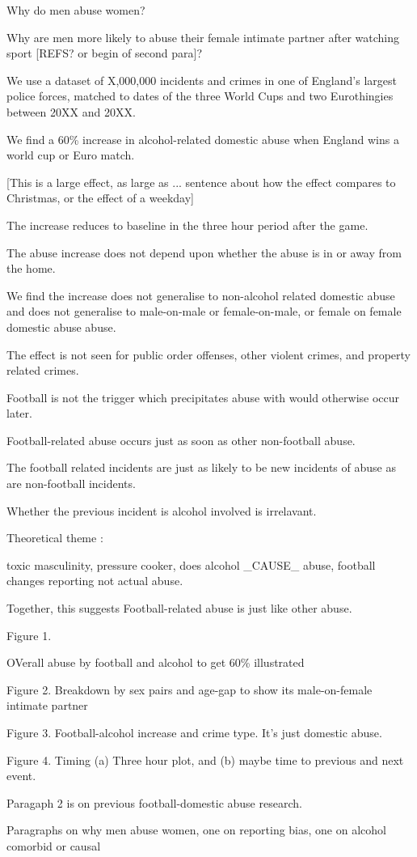 Why do men abuse women?


Why are men more likely to abuse their female intimate partner after watching sport [REFS? or begin of second para]?

We use a dataset of X,000,000 incidents and crimes in one of England's largest police forces, matched to dates of the three World Cups and two Eurothingies between 20XX and 20XX.

We find a 60\% increase in alcohol-related domestic abuse when England wins a world cup or Euro match. 

[This is a large effect, as large as ... sentence about how the effect compares to Christmas, or the effect of a weekday]

The increase reduces to baseline in the three hour period after the game.

The abuse increase does not depend upon whether the abuse is in or away from the home.

We find the increase does not generalise to non-alcohol related domestic abuse and does not generalise to male-on-male or female-on-male, or female on female domestic abuse abuse. 

The effect is not seen for public order offenses, other violent crimes, and property related crimes.  

Football is not the trigger which precipitates abuse with would otherwise occur later. 

Football-related abuse occurs just as soon as other non-football abuse. 

The football related incidents are just as likely to be new incidents of abuse as are non-football incidents. 


Whether the previous incident is alcohol involved is irrelavant.

Theoretical theme :

toxic masculinity, pressure cooker, does alcohol _CAUSE_ abuse, football changes reporting not actual abuse.

Together, this suggests Football-related abuse is just like other abuse. 


Figure 1.

OVerall abuse by football and alcohol to get 60\% illustrated

Figure 2. Breakdown by sex pairs and age-gap to show its male-on-female intimate partner

Figure 3. Football-alcohol increase and crime type. It's just domestic abuse.

Figure 4. Timing (a) Three hour plot, and (b) maybe time to previous and next event.

Paragaph 2 is on previous football-domestic abuse research.

Paragraphs on why men abuse women, one on reporting bias, one on alcohol comorbid or causal


